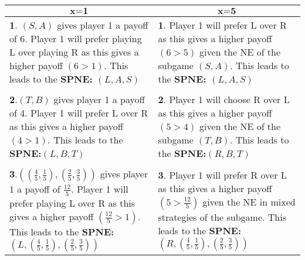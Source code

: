 \documentclass[a4paper]{article}
\begin{document}
\begin{center}

\begin{tabular}{  p{18em}  p{18em}  } 
\multicolumn{1}{c}{$\textbf{x=1}$} & \multicolumn{1}{c}{$\textbf{x=5}$}\\
\hline
\textbf1. $(S,A)$ gives player 1 a payoff of 6. Player 1 will prefer playing L over playing R as this gives a higher payoff $(6>1)$. This leads to the \textbf{SPNE: $(L,A,S)$} & \textbf1. Player 1 will prefer L over R as this gives a higher payoff $(6>5)$ given the NE of the subgame $(S,A)$. This leads to the \textbf{SPNE: $(L,A,S)$}\\
\\
\textbf2.$(T,B)$ gives player 1 a payoff of 4. Player 1 will prefer L over R as this gives a higher payoff $(4>1)$. This leads to the \textbf{SPNE:$(L,B,T)$} & \textbf2. Player 1 will choose R over L as this gives a higher payoff $(5>4)$  given the NE of the subgame $(T,B)$. This leads to the \textbf{SPNE:$(R,B,T)$} \\
\\
\textbf3.$\left(\left(\frac{4}{5},\frac{1}{5}\right),\left(\frac{2}{5},\frac{3}{5}\right)\right)$ gives player 1 a payoff of $\frac{12}{5}$. Player 1 will prefer playing L over R as this gives a higher payoff $(\frac{12}{5}>1)$. This leads to the \textbf{SPNE: $(L,\left(\frac{4}{5},\frac{1}{5}\right),\left(\frac{2}{5},\frac{3}{5}\right))$} & \textbf3. Player 1 will prefer R over L as this gives a higher payoff $(5>\frac{12}{5})$ given the NE in mixed strategies of the subgame. This leads to the \textbf{SPNE:$\left(R,\left(\frac{4}{5},\frac{1}{5}\right),\left(\frac{2}{5},\frac{3}{5}\right)\right)$} \\
\end{tabular}
\end{center}
\end{document}
